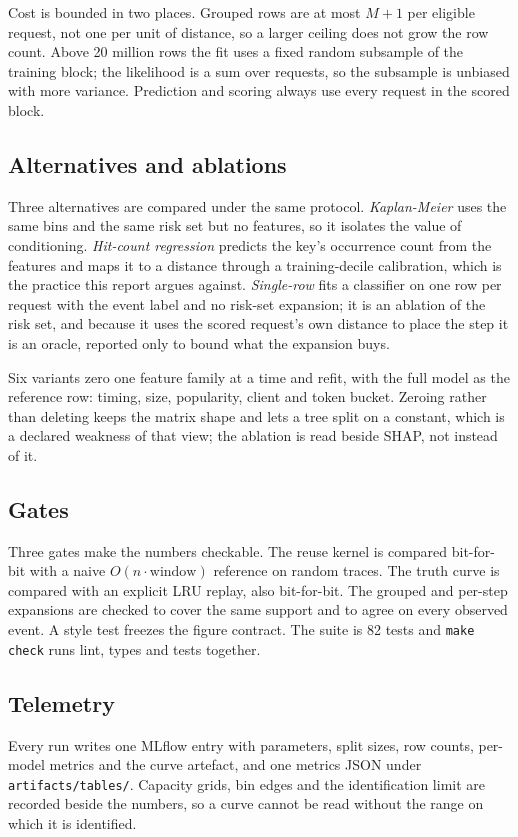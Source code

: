 Cost is bounded in two places. Grouped rows are at most $M+1$ per eligible request,
not one per unit of distance, so a larger ceiling does not grow the row count. Above
20 million rows the fit uses a fixed random subsample of the training block; the
likelihood is a sum over requests, so the subsample is unbiased with more variance.
Prediction and scoring always use every request in the scored block.

\subsection{Alternatives and ablations}
\label{sec:alternatives}

Three alternatives are compared under the same protocol. \emph{Kaplan-Meier} uses
the same bins and the same risk set but no features, so it isolates the value of
conditioning. \emph{Hit-count regression} predicts the key's occurrence count from
the features and maps it to a distance through a training-decile calibration, which
is the practice this report argues against. \emph{Single-row} fits a classifier on
one row per request with the event label and no risk-set expansion; it is an
ablation of the risk set, and because it uses the scored request's own distance to
place the step it is an oracle, reported only to bound what the expansion buys.

Six variants zero one feature family at a time and refit, with the full model as the
reference row: timing, size, popularity, client and token bucket. Zeroing rather than deleting keeps
the matrix shape and lets a tree split on a constant, which is a declared weakness
of that view; the ablation is read beside SHAP, not instead of it.

\subsection{Gates}
\label{sec:gates}

Three gates make the numbers checkable. The reuse kernel is compared bit-for-bit
with a naive $O(n\cdot\text{window})$ reference on random traces. The truth curve is
compared with an explicit LRU replay, also bit-for-bit. The grouped and per-step
expansions are checked to cover the same support and to agree on every observed
event. A style test freezes the figure contract. The suite is 82 tests and
\texttt{make check} runs lint, types and tests together.

\subsection{Telemetry}
\label{sec:telemetry}

Every run writes one MLflow entry with parameters, split sizes, row counts,
per-model metrics and the curve artefact, and one metrics JSON under
\texttt{artifacts/tables/}. Capacity grids, bin edges and the identification limit
are recorded beside the numbers, so a curve cannot be read without the range on
which it is identified.
